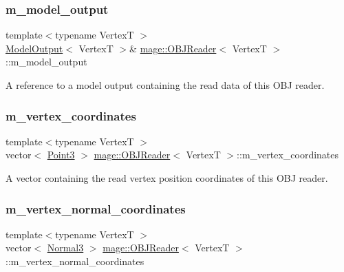 \subsubsection{\texorpdfstring{m\+\_\+model\+\_\+output}{m\_model\_output}}
{\footnotesize\ttfamily template$<$typename VertexT $>$ \\
\hyperlink{structmage_1_1_model_output}{Model\+Output}$<$ VertexT $>$\& \hyperlink{classmage_1_1_o_b_j_reader}{mage\+::\+O\+B\+J\+Reader}$<$ VertexT $>$\+::m\+\_\+model\+\_\+output\hspace{0.3cm}{\ttfamily [private]}}

A reference to a model output containing the read data of this O\+BJ reader. \hypertarget{classmage_1_1_o_b_j_reader_a1032eb4a6844a99f1d96fc17c3e52aee}{}\label{classmage_1_1_o_b_j_reader_a1032eb4a6844a99f1d96fc17c3e52aee} 
\subsubsection{\texorpdfstring{m\+\_\+vertex\+\_\+coordinates}{m\_vertex\_coordinates}}
{\footnotesize\ttfamily template$<$typename VertexT $>$ \\
vector$<$ \hyperlink{structmage_1_1_point3}{Point3} $>$ \hyperlink{classmage_1_1_o_b_j_reader}{mage\+::\+O\+B\+J\+Reader}$<$ VertexT $>$\+::m\+\_\+vertex\+\_\+coordinates\hspace{0.3cm}{\ttfamily [private]}}

A vector containing the read vertex position coordinates of this O\+BJ reader. \hypertarget{classmage_1_1_o_b_j_reader_a765e87afe7bd138dadcfc8c194311ed3}{}\label{classmage_1_1_o_b_j_reader_a765e87afe7bd138dadcfc8c194311ed3} 
\subsubsection{\texorpdfstring{m\+\_\+vertex\+\_\+normal\+\_\+coordinates}{m\_vertex\_normal\_coordinates}}
{\footnotesize\ttfamily template$<$typename VertexT $>$ \\
vector$<$ \hyperlink{structmage_1_1_normal3}{Normal3} $>$ \hyperlink{classmage_1_1_o_b_j_reader}{mage\+::\+O\+B\+J\+Reader}$<$ VertexT $>$\+::m\+\_\+vertex\+\_\+normal\+\_\+coordinates\hspace{0.3cm}{\ttfamily [private]}}

